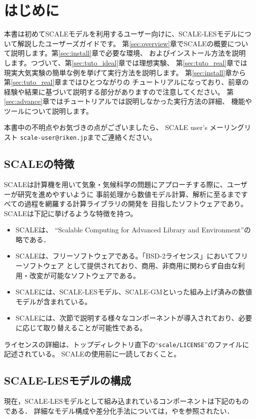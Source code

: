 \section{はじめに}

本書は初めてSCALEモデルを利用するユーザー向けに、SCALE-LESモデルについて解説したユーザーズガイドです。
第\ref{sec:overview}章でSCALEの概要について説明します。第\ref{sec:install}章で必要な環境、
およびインストール方法を説明します。つづいて、第\ref{sec:tuto_ideal}章では理想実験、
第\ref{sec:tuto_real}章では現実大気実験の簡単な例を挙げて実行方法を説明します。
第\ref{sec:install}章から第\ref{sec:tuto_real}章まではひとつながりの
チュートリアルになっており、前章の経験や結果に基づいて説明する部分がありますので注意してください。
第\ref{sec:advance}章ではチュートリアルでは説明しなかった実行方法の詳細、
機能やツールについて説明します。

本書中の不明点やお気づきの点がございましたら、
SCALE user's メーリングリスト \verb|scale-user@riken.jp|までご連絡ください。



\subsection{SCALEの特徴}
SCALEは計算機を用いて気象・気候科学の問題にアプローチする際に、ユーザーが研究を進めやすいように
事前処理から数値モデル計算、解析に至るまですべての過程を網羅する計算ライブラリの開発を
目指したソフトウェアであり。SCALEは下記に挙げるような特徴を持つ。
\begin{itemize}
\item SCALEは、 ``Scalable Computing for Advanced Library and Environment''の略である．
\item SCALEは、フリーソフトウェアである。「BSD-2ライセンス」においてフリーソフトウェア
として提供されており、商用、非商用に関わらず自由な利用・改変が可能なソフトウェアである。
\item SCALEには、SCALE-LESモデル、SCALE-GMといった組み上げ済みの数値モデルが含まれている。
\item SCALEには、次節で説明する様々なコンポーネントが導入されており、必要に応じて取り替えることが可能性である。
\end{itemize}

ライセンスの詳細は、トップディレクトリ直下の``\verb|scale/LICENSE|''のファイルに記述されている。
SCALEの使用前に一読しておくこと。

\subsection{SCALE-LESモデルの構成}
現在，SCALE-LESモデルとして組み込まれているコンポーネントは下記のものである．
詳細なモデル構成や差分化手法については，\cite{scale_2015}や\cite{nishizawa_2015}を参照されたい．\\

